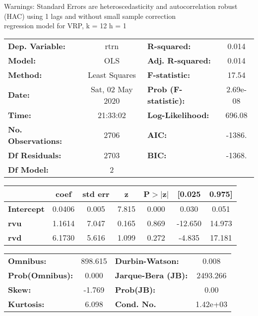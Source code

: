 Warnings: \newline
 [1] Standard Errors are heteroscedasticity and autocorrelation robust (HAC) using 1 lags and without small sample correction\\ 

regression model for VRP, k = 12 h = 1\begin{center}
\begin{tabular}{lclc}
\toprule
\textbf{Dep. Variable:}    &       rtrn       & \textbf{  R-squared:         } &     0.014   \\
\textbf{Model:}            &       OLS        & \textbf{  Adj. R-squared:    } &     0.014   \\
\textbf{Method:}           &  Least Squares   & \textbf{  F-statistic:       } &     17.54   \\
\textbf{Date:}             & Sat, 02 May 2020 & \textbf{  Prob (F-statistic):} &  2.69e-08   \\
\textbf{Time:}             &     21:33:02     & \textbf{  Log-Likelihood:    } &    696.08   \\
\textbf{No. Observations:} &        2706      & \textbf{  AIC:               } &    -1386.   \\
\textbf{Df Residuals:}     &        2703      & \textbf{  BIC:               } &    -1368.   \\
\textbf{Df Model:}         &           2      & \textbf{                     } &             \\
\bottomrule
\end{tabular}
\begin{tabular}{lcccccc}
                   & \textbf{coef} & \textbf{std err} & \textbf{z} & \textbf{P$> |$z$|$} & \textbf{[0.025} & \textbf{0.975]}  \\
\midrule
\textbf{Intercept} &       0.0406  &        0.005     &     7.815  &         0.000        &        0.030    &        0.051     \\
\textbf{rvu}       &       1.1614  &        7.047     &     0.165  &         0.869        &      -12.650    &       14.973     \\
\textbf{rvd}       &       6.1730  &        5.616     &     1.099  &         0.272        &       -4.835    &       17.181     \\
\bottomrule
\end{tabular}
\begin{tabular}{lclc}
\textbf{Omnibus:}       & 898.615 & \textbf{  Durbin-Watson:     } &    0.008  \\
\textbf{Prob(Omnibus):} &   0.000 & \textbf{  Jarque-Bera (JB):  } & 2493.266  \\
\textbf{Skew:}          &  -1.769 & \textbf{  Prob(JB):          } &     0.00  \\
\textbf{Kurtosis:}      &   6.098 & \textbf{  Cond. No.          } & 1.42e+03  \\
\bottomrule
\end{tabular}
\end{center}

